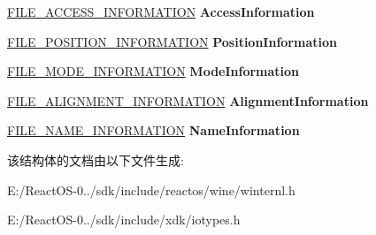 \begin{DoxyCompactItemize}
\hyperlink{struct___f_i_l_e___a_c_c_e_s_s___i_n_f_o_r_m_a_t_i_o_n}{F\+I\+L\+E\+\_\+\+A\+C\+C\+E\+S\+S\+\_\+\+I\+N\+F\+O\+R\+M\+A\+T\+I\+ON} {\bfseries Access\+Information}
\item 
\mbox{\label{struct___f_i_l_e___a_l_l___i_n_f_o_r_m_a_t_i_o_n_ac1b8def61144167a7d011a3772c25e27}} 
\hyperlink{struct___f_i_l_e___p_o_s_i_t_i_o_n___i_n_f_o_r_m_a_t_i_o_n}{F\+I\+L\+E\+\_\+\+P\+O\+S\+I\+T\+I\+O\+N\+\_\+\+I\+N\+F\+O\+R\+M\+A\+T\+I\+ON} {\bfseries Position\+Information}
\item 
\mbox{\label{struct___f_i_l_e___a_l_l___i_n_f_o_r_m_a_t_i_o_n_a1cddbf7585a0f75280d2dc25acb56404}} 
\hyperlink{struct___f_i_l_e___m_o_d_e___i_n_f_o_r_m_a_t_i_o_n}{F\+I\+L\+E\+\_\+\+M\+O\+D\+E\+\_\+\+I\+N\+F\+O\+R\+M\+A\+T\+I\+ON} {\bfseries Mode\+Information}
\item 
\mbox{\label{struct___f_i_l_e___a_l_l___i_n_f_o_r_m_a_t_i_o_n_a8562218f29f6195c020b56ca806d899c}} 
\hyperlink{struct___f_i_l_e___a_l_i_g_n_m_e_n_t___i_n_f_o_r_m_a_t_i_o_n}{F\+I\+L\+E\+\_\+\+A\+L\+I\+G\+N\+M\+E\+N\+T\+\_\+\+I\+N\+F\+O\+R\+M\+A\+T\+I\+ON} {\bfseries Alignment\+Information}
\item 
\mbox{\label{struct___f_i_l_e___a_l_l___i_n_f_o_r_m_a_t_i_o_n_a86b8211276060fca927a40f774c15eab}} 
\hyperlink{struct___f_i_l_e___n_a_m_e___i_n_f_o_r_m_a_t_i_o_n}{F\+I\+L\+E\+\_\+\+N\+A\+M\+E\+\_\+\+I\+N\+F\+O\+R\+M\+A\+T\+I\+ON} {\bfseries Name\+Information}
\end{DoxyCompactItemize}


该结构体的文档由以下文件生成\+:\begin{DoxyCompactItemize}
\item 
E\+:/\+React\+O\+S-\/0../sdk/include/reactos/wine/winternl.\+h\item 
E\+:/\+React\+O\+S-\/0../sdk/include/xdk/iotypes.\+h\end{DoxyCompactItemize}
